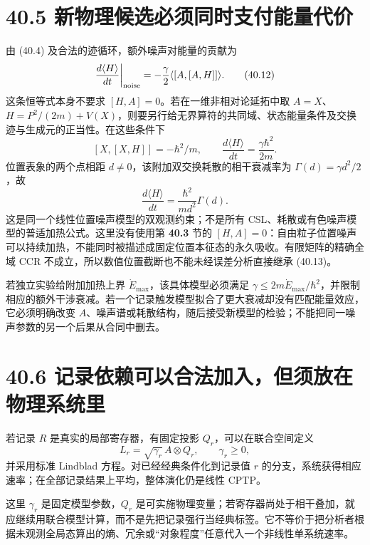 \documentclass[
  11pt,
  oneside]{book}
\begin{document}
\hypertarget{ux65b0ux7269ux7406ux5019ux9009ux5fc5ux987bux540cux65f6ux652fux4ed8ux80fdux91cfux4ee3ux4ef7}{%
\section{40.5
新物理候选必须同时支付能量代价}\label{ux65b0ux7269ux7406ux5019ux9009ux5fc5ux987bux540cux65f6ux652fux4ed8ux80fdux91cfux4ee3ux4ef7}}

由 (40.4) 及合法的迹循环，额外噪声对能量的贡献为 \[
\frac{d\langle H\rangle}{dt}\bigg|_{\rm noise}
=-\frac\gamma2\langle[A,[A,H]]\rangle.
\tag{40.12}
\] 这条恒等式本身不要求 \([H,A]=0\)。若在一维非相对论延拓中取
\(A=X\)、\(H=P^2/(2m)+V(X)\)，则要另行给无界算符的共同域、状态能量条件及交换迹与生成元的正当性。在这些条件下
\[
[X,[X,H]]=-\hbar^2/m,
\qquad\frac{d\langle H\rangle}{dt}=\frac{\gamma\hbar^2}{2m}.
\tag{40.13}
\] 位置表象的两个点相距 \(d\ne0\)，该附加双交换耗散的相干衰减率为
\(\Gamma(d)=\gamma d^2/2\)，故 \[
\boxed{\frac{d\langle H\rangle}{dt}
=\frac{\hbar^2}{md^2}\Gamma(d).}
\tag{40.14}
\] 这是同一个线性位置噪声模型的双观测约束；不是所有
CSL、耗散或有色噪声模型的普适加热公式。这里没有使用第 \textbf{40.3} 节的
\([H,A]=0\)：自由粒子位置噪声可以持续加热，不能同时被描述成固定位置本征态的永久吸收。有限矩阵的精确全域
CCR 不成立，所以数值位置截断也不能未经误差分析直接继承 (40.13)。

若独立实验给附加加热上界 \(\dot E_{\max}\)，该具体模型必须满足
\(\gamma\le2m\dot E_{\max}/\hbar^2\)，并限制相应的额外干涉衰减。若一个记录触发模型拟合了更大衰减却没有匹配能量效应，它必须明确改变
\(A\)、噪声谱或耗散结构，随后接受新模型的检验；不能把同一噪声参数的另一个后果从合同中删去。

\hypertarget{ux8bb0ux5f55ux4f9dux8d56ux53efux4ee5ux5408ux6cd5ux52a0ux5165ux4f46ux987bux653eux5728ux7269ux7406ux7cfbux7edfux91cc}{%
\section{40.6
记录依赖可以合法加入，但须放在物理系统里}\label{ux8bb0ux5f55ux4f9dux8d56ux53efux4ee5ux5408ux6cd5ux52a0ux5165ux4f46ux987bux653eux5728ux7269ux7406ux7cfbux7edfux91cc}}

若记录 \(R\) 是真实的局部寄存器，有固定投影 \(Q_r\)，可以在联合空间定义
\[
L_r=\sqrt{\gamma_r}\,A\otimes Q_r,\qquad\gamma_r\ge0,
\] 并采用标准 Lindblad 方程。对已经经典条件化到记录值 \(r\)
的分支，系统获得相应速率；在全部记录结果上平均，整体演化仍是线性 CPTP。

这里 \(\gamma_r\) 是固定模型参数，\(Q_r\)
是可实施物理变量；若寄存器尚处于相干叠加，就应继续用联合模型计算，而不是先把记录强行当经典标签。它不等价于把分析者根据未观测全局态算出的熵、冗余或``对象程度''任意代入一个非线性单系统速率。
\end{document}
